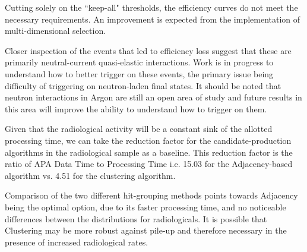 \documentclass[11pt]{article}
\begin{document}
Cutting solely on the ``keep-all" thresholds, the efficiency curves do not meet the necessary requirements. An improvement is expected from the implementation of multi-dimensional selection.

Closer inspection of the events that led to efficiency loss suggest that these are primarily neutral-current quasi-elastic interactions. Work is in progress to understand how to better trigger on these events, the primary issue being difficulty of triggering on neutron-laden final states. It should be noted that neutron interactions in Argon are still an open area of study and future results in this area will improve the ability to understand how to trigger on them.

Given that the radiological activity will be a constant sink of the allotted processing time, we can take the reduction factor for the candidate-production algorithms in the radiological sample as a baseline. This reduction factor is the ratio of APA Data Time to Processing Time i.e. 15.03 for the Adjacency-based algorithm vs. 4.51 for the clustering algorithm.  

Comparison of the two different hit-grouping methods points towards Adjacency being the optimal option, due to its faster processing time, and no noticeable differences between the distributions for radiologicals. It is possible that Clustering may be more robust against pile-up and therefore necessary in the presence of increased radiological rates. 
\end{document}
